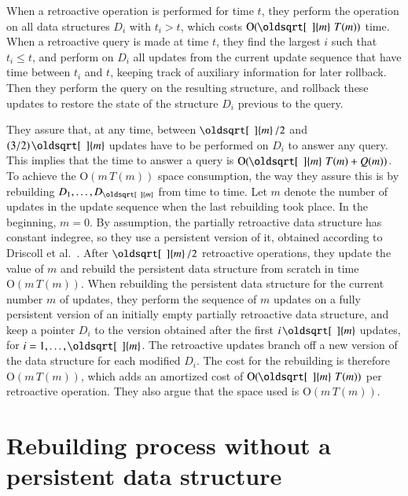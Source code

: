 \documentclass[3p,times,procedia]{elsarticle}
\renewcommand{\sqrt}[2][\mkern8mu]{\mkern-1mu\mathop{\oldsqrt[#1]{#2}}}
\newcommand{\Oh}{\mathrm{O}}
\begin{document}
When a retroactive operation is performed for time $t$, they perform the operation 
on all data structures $D_i$ with $t_i>t$, which costs $\Oh(\sqrt{m}\,T(m))$ time.  
When a retroactive query is made at time $t$, they find the largest $i$ such that 
$t_i \leq t$, and perform on $D_i$ all updates from the current update sequence that 
have time between $t_i$ and $t$, keeping track of auxiliary information for later rollback. 
Then they perform the query on the resulting structure, and rollback these 
updates to restore the state of the structure $D_i$ previous to the query.

They assure that, at any time, between $\sqrt{m}/2$ and $(3/2)\sqrt{m}$ updates have 
to be performed on $D_i$ to answer any query.  This implies that the time to answer a 
query is $\Oh(\sqrt{m}\,T(m)+Q(m))$.  To achieve the $\Oh(m\,T(m))$ space consumption, 
the way they assure this is by rebuilding $D_1,\ldots,D_{\sqrt{m}}$ from time to time.  
Let $m$ denote the number of updates in the update sequence when the last rebuilding took place.
In the beginning, $m=0$. 
By assumption, the partially retroactive data structure has constant indegree, so they use 
a persistent version of it, obtained according to Driscoll et al.~\cite{DriscollSST1989}.
After $\sqrt{m}/2$ retroactive operations, they update the value of $m$ and 
rebuild the persistent data structure from scratch in time $\Oh(m\,T(m))$. 
When rebuilding the persistent data structure for the current number $m$ of updates, 
they perform the sequence of $m$ updates on a fully persistent version of an 
initially empty partially retroactive data structure, and keep a pointer $D_i$ 
to the version obtained after the first $i\sqrt{m}$ updates, for $i = 1,\ldots,\sqrt{m}$. 
The retroactive updates branch off a new version of the data structure for each modified $D_i$.  
The cost for the rebuilding is therefore $\Oh(m\,T(m))$, 
which adds an amortized cost of $\Oh(\sqrt{m}\,T(m))$ per retroactive operation. 
They also argue that the space used is $\Oh(m\,T(m))$.


\section{Rebuilding process without a persistent data structure}\label{sec:rebuilding}
\end{document}
